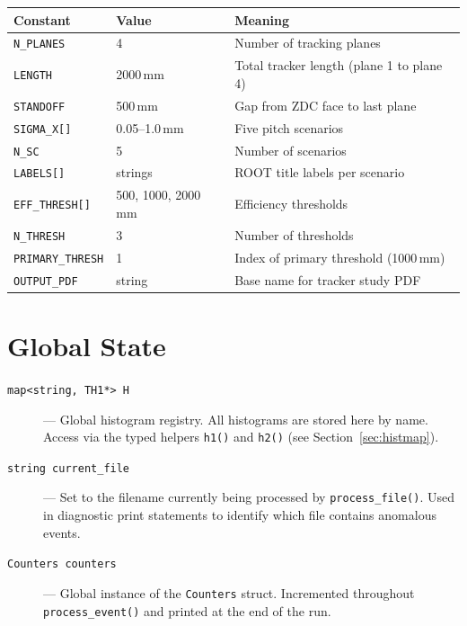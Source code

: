 \documentclass[11pt]{article}
\begin{document}
\begin{center}
\renewcommand{\arraystretch}{1.3}
\begin{tabular}{lll}
\toprule
Constant & Value & Meaning \\
\midrule
\texttt{N\_PLANES} & 4 & Number of tracking planes \\
\texttt{LENGTH} & 2000\,mm & Total tracker length (plane 1 to plane 4) \\
\texttt{STANDOFF} & 500\,mm & Gap from ZDC face to last plane \\
\texttt{SIGMA\_X[]} & 0.05--1.0\,mm & Five pitch scenarios \\
\texttt{N\_SC} & 5 & Number of scenarios \\
\texttt{LABELS[]} & strings & ROOT title labels per scenario \\
\texttt{EFF\_THRESH[]} & 500, 1000, 2000\,mm & Efficiency thresholds \\
\texttt{N\_THRESH} & 3 & Number of thresholds \\
\texttt{PRIMARY\_THRESH} & 1 & Index of primary threshold (1000\,mm) \\
\texttt{OUTPUT\_PDF} & string & Base name for tracker study PDF \\
\bottomrule
\end{tabular}
\end{center}

\section{Global State}

\begin{description}
  \item[\texttt{map<string, TH1*> H}] --- Global histogram registry.
        All histograms are stored here by name. Access via the typed
        helpers \texttt{h1()} and \texttt{h2()} (see Section~\ref{sec:histmap}).

  \item[\texttt{string current\_file}] --- Set to the filename currently
        being processed by \texttt{process\_file()}. Used in diagnostic
        print statements to identify which file contains anomalous events.

  \item[\texttt{Counters counters}] --- Global instance of the
        \texttt{Counters} struct. Incremented throughout
        \texttt{process\_event()} and printed at the end of the run.
\end{description}
\end{document}
